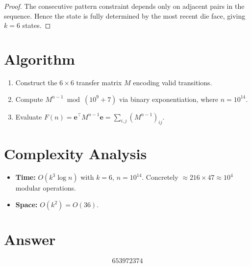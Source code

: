 \documentclass[12pt]{article}
\begin{document}
\begin{proof}
The consecutive pattern constraint depends only on adjacent pairs in the sequence. Hence the state is fully determined by the most recent die face, giving $k=6$ states.
\end{proof}

\section{Algorithm}
\begin{enumerate}
    \item Construct the $6 \times 6$ transfer matrix $M$ encoding valid transitions.
    \item Compute $M^{n-1} \bmod (10^9+7)$ via binary exponentiation, where $n = 10^{14}$.
    \item Evaluate $F(n) = \mathbf{e}^\top M^{n-1} \mathbf{e} = \sum_{i,j} (M^{n-1})_{ij}$.
\end{enumerate}

\section{Complexity Analysis}
\begin{itemize}
    \item \textbf{Time:} $O(k^3 \log n)$ with $k=6$, $n=10^{14}$. Concretely $\approx 216 \times 47 \approx 10^4$ modular operations.
    \item \textbf{Space:} $O(k^2) = O(36)$.
\end{itemize}

\section{Answer}

\[
\boxed{653972374}
\]
\end{document}
